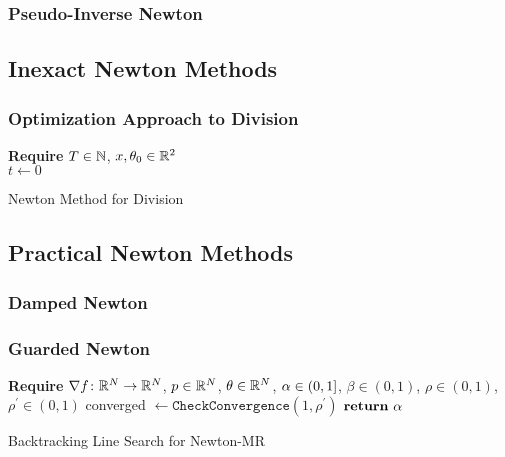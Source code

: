 \documentclass[../../thesis.tex]{subfiles}
\begin{document}
\subsubsection{Pseudo-Inverse Newton}

\subsection{Inexact Newton Methods}

\subsubsection{Optimization Approach to Division}

\begin{algorithm}[H]
    \SetAlgoLined{}
    \textbf{Require}
    $T\in \mathbb{N}$, $x, \theta_0 \in \mathbb{R}^2$\ \\
    $t \leftarrow 0$\\
    \caption{Newton Method for Division}
\end{algorithm}

\subsection{Practical Newton Methods}

\subsubsection{Damped Newton}

\subsubsection{Guarded Newton}

\begin{algorithm}[H]
    \SetAlgoLined{}
    \textbf{Require}
    $\nabla f\colon\mathbb{R}^N\to\mathbb{R}^N$,
    $p \in \mathbb{R}^N$,
    $\theta \in \mathbb{R}^N$,
    $\alpha \in \intervaloc{0}{1}$,
    $\beta \in (0, 1)$,
    $\rho \in (0, 1)$,
    $\rho^\prime \in (0, 1)$
    \DontPrintSemicolon
    \;
    converged $\leftarrow \texttt{CheckConvergence}\left(
    	1, \rho^\prime\right)$\;
    $\KwRet\ \alpha$
    \caption{Backtracking Line Search for Newton-MR}
\end{algorithm}
\end{document}
